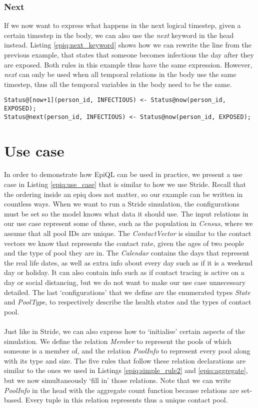 \subsubsection{Next}
If we now want to express what happens in the next logical timestep, given a certain timestep in the body, we can also use the \textit{next} keyword in the head instead. Listing \ref{epiq:next_keyword} shows how we can rewrite the line from the previous example, that states that someone becomes infectious the day after they are exposed. Both rules in this example thus have the same expression. However, \textit{next} can only be used when all temporal relations in the body use the same timestep, thus all the temporal variables in the body need to be the same.

\begin{lstlisting}[caption={Temporal keyword `next'.}, label={epiq:next_keyword}]
Status@[now+1](person_id, INFECTIOUS) <- Status@now(person_id, EXPOSED);
Status@next(person_id, INFECTIOUS) <- Status@now(person_id, EXPOSED);
\end{lstlisting}

\section{Use case}
\label{sec:use_case}
In order to demonstrate how EpiQL can be used in practice, we present a use case in Listing \ref{epiq:use_case} that is similar to how we use Stride. Recall that the ordering inside an epiq does not matter, so our example can be written in countless ways. When we want to run a Stride simulation, the configurations must be set so the model knows what data it should use. The input relations in our use case represent some of these, such as the population in \textit{Census}, where we assume that all pool IDs are unique. The \textit{ContactVector} is similar to the contact vectors we know that represents the contact rate, given the ages of two people and the type of pool they are in. The \textit{Calendar} contains the days that represent the real life dates, as well as extra info about every day such as if it is a weekend day or holiday. It can also contain info such as if contact tracing is active on a day or social distancing, but we do not want to make our use case unnecessary detailed. The last `configurations' that we define are the enumerated types \textit{State} and \textit{PoolType}, to respectively describe the health states and the types of contact pool.
\\\\
Just like in Stride, we can also express how to `initialise' certain aspects of the simulation. We define the relation \textit{Member} to represent the pools of which someone is a member of, and the relation \textit{PoolInfo} to represent every pool along with its type and size. The five rules that follow these relation declarations are similar to the ones we used in Listings \ref{epiq:simple_rule2} and \ref{epiq:aggregate}, but we now simultaneously `fill in' those relations. Note that we can write \textit{PoolInfo} in the head with the aggregate count function because relations are set-based. Every tuple in this relation represents thus a unique contact pool.\\

